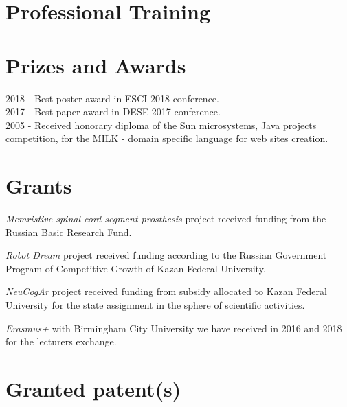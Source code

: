 \documentclass{moderncv}
\begin{document}

\section{Professional Training}


\section{Prizes and Awards}

2018 - Best poster award in ESCI-2018 conference.\\
2017 - Best paper award in DESE-2017 conference.\\
2005 - Received honorary diploma of the Sun microsystems, Java projects competition, for the MILK - domain specific language for web sites creation.\\

\section{Grants}

\emph{Memristive spinal cord segment prosthesis} project received funding from the Russian Basic Research Fund.

\emph{Robot Dream} project received funding according to the Russian Government Program of Competitive Growth of Kazan Federal University.

\emph{NeuCogAr} project received funding from subsidy allocated to Kazan Federal University for the state assignment in the sphere of scientific activities.

\emph{Erasmus+} with Birmingham City University we have received in 2016 and 2018 for the lecturers exchange. 

\section{Granted patent(s)}
\end{document}
